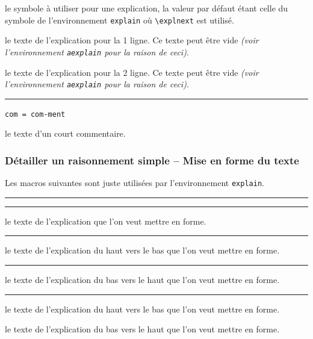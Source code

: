 \documentclass[12pt,a4paper]{article}
\newcommand\env[1]{\texttt{#1}}
\newcommand\macro[1]{\env{\textbackslash{}#1}}
\theoremstyle{definition}
\newcommand\separation{
	\medskip
	\hfill\rule{0.5\textwidth}{0.75pt}\hfill
	\medskip
}
\newcommand\mwhyprefix[2]{%
	\texttt{#1 = #1-#2}%
}
\begin{document}

\IDoption{} le symbole à utiliser pour une explication, la valeur par défaut étant celle du symbole de l'environnement \env{explain} où \macro{explnext} est utilisé.

 le texte de l'explication pour la 1\iere{} ligne.
          Ce texte peut être vide \emph{(voir l'environnement \env{aexplain} pour la raison de ceci)}.

 le texte de l'explication pour la 2\ieme{} ligne.
          Ce texte peut être vide \emph{(voir l'environnement \env{aexplain} pour la raison de ceci)}.


\separation


  \hfill \mwhyprefix{com}{ment}



\IDarg{} le texte d'un court commentaire.




\subsubsection{Détailler un raisonnement simple -- Mise en forme du texte}

Les macros suivantes sont juste utilisées par l'environnement \env{explain}.


\separation




\separation



\IDarg{} le texte de l'explication que l'on veut mettre en forme.


\separation



\IDarg{} le texte de l'explication du haut vers le bas que l'on veut mettre en forme.


\separation



\IDarg{} le texte de l'explication du bas vers le haut que l'on veut mettre en forme.


\separation



 le texte de l'explication du haut vers le bas que l'on veut mettre en forme.

 le texte de l'explication du bas vers le haut que l'on veut mettre en forme.
\end{document}
